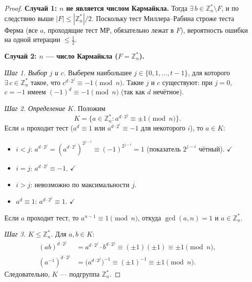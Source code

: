 \begin{proof}
	\textbf{Случай 1: $n$ не является числом Кармайкла.} Тогда $\exists\, b \in \mathbb{Z}_n^* \setminus F$, и по следствию выше $|F| \leq |\mathbb{Z}_n^*|/2$. Поскольку тест Миллера--Рабина строже теста Ферма (все $a$, проходящие тест МР, обязательно лежат в $F$), вероятность ошибки на одной итерации $\leq \tfrac{1}{2}$.
	
	\medskip
	\textbf{Случай 2: $n$ --- число Кармайкла ($F = \mathbb{Z}_n^*$).}
	
	\smallskip
	\textit{Шаг 1. Выбор $j$ и $c$.}\; Выберем наибольшее $j \in \{0,1,\ldots,t-1\}$, для которого $\exists\, c \in \mathbb{Z}_n^*$ такое, что $c^{d\cdot 2^j} \equiv -1 \pmod{n}$. Такие $j$ и $c$ существуют: при $j = 0$, $c = -1$ имеем $(-1)^d \equiv -1 \pmod{n}$ (так как $d$ нечётное).
	
	\smallskip
	\textit{Шаг 2. Определение $K$.}\; Положим
	\[
	K = \bigl\{a \in \mathbb{Z}_n^* : a^{d\cdot 2^j} \equiv \pm 1 \pmod{n}\bigr\}.
	\]
	Если $a$ проходит тест ($a^d \equiv 1$ или $a^{d\cdot 2^i} \equiv -1$ для некоторого $i$), то $a \in K$:
	\begin{itemize}
		\item $i < j$:\; $a^{d\cdot 2^j} = (a^{d\cdot 2^i})^{2^{j-i}} \equiv (-1)^{2^{j-i}} = 1$ (показатель $2^{j-i}$ чётный). $\checkmark$
		\item $i = j$:\; $a^{d\cdot 2^j} \equiv -1$. $\checkmark$
		\item $i > j$:\; невозможно по максимальности $j$.
		\item $a^d \equiv 1$:\; $a^{d\cdot 2^j} \equiv 1$. $\checkmark$
	\end{itemize}
	Если $a$ проходит тест, то $a^{n-1} \equiv 1 \pmod{n}$, откуда $\gcd(a,n)=1$ и $a \in \mathbb{Z}_n^*$.
	
	\smallskip
	\textit{Шаг 3. $K \leq \mathbb{Z}_n^*$.}\; Для $a,b \in K$:
	\begin{align*}
		(ab)^{d\cdot 2^j}
		&= a^{d\cdot 2^j} \cdot b^{d\cdot 2^j} \equiv (\pm 1)(\pm 1) \equiv \pm 1 \pmod{n},\\
		(a^{-1})^{d\cdot 2^j}
		&= \bigl(a^{d\cdot 2^j}\bigr)^{-1} \equiv (\pm 1)^{-1} \equiv \pm 1 \pmod{n}.
	\end{align*}
	Следовательно, $K$ --- подгруппа $\mathbb{Z}_n^*$.
	

\end{proof}

